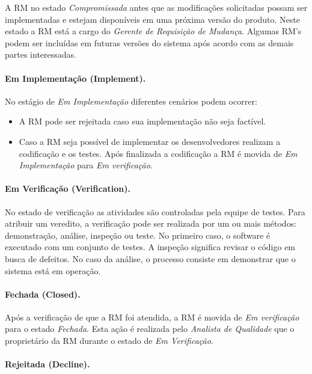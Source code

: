 A RM no estado \textit{Compromissada} antes que as modificações solicitadas
possam ser implementadas e estejam disponíveis em uma próxima versão do produto.
Neste estado a RM está a cargo do \textit{Gerente de Requisição de Mudança}.
Algumas RM's podem ser incluídas em futuras versões do sistema após acordo com
as demais partes interessadas.

\paragraph{Em Implementação (Implement).}
\label{par:em_implementacao}

No estágio de \textit{Em Implementação} diferentes cenários podem ocorrer:

\begin{itemize}
	\item A RM pode ser rejeitada caso sua implementação não seja factível.
	\item Caso a RM seja possível de implementar os desenvolvedores realizam a
		codificação e os testes. Após finalizada a codificação a RM é movida de
		\textit{Em Implementação} para \textit{Em verificação}.
\end{itemize}

\paragraph{Em Verificação (Verification).}
\label{par:em_verificacao}

No estado de verificação as atividades são controladas pela equipe de testes.
Para atribuir um veredito, a verificação pode ser realizada por um ou mais
métodos: demonstração, análise, inspeção ou teste. No primeiro caso, o software
é executado com um conjunto de testes. A inspeção significa revisar o código em
busca de defeitos. No caso da análise, o processo consiste em demonstrar que o
sistema está em operação.

\paragraph{Fechada (Closed).}
\label{par:fechada}

Após a verificação de que a RM foi atendida, a RM é movida de \textit{Em
	verificação} para o estado \textit{Fechada}. Esta ação é realizada pelo
\textit{Analista de Qualidade} que o proprietário da RM durante o estado de
\textit{Em Verificação}.

\paragraph{Rejeitada (Decline).}
\label{par:rejeitada}

